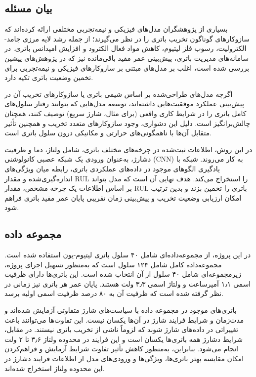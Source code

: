 \subsection{بیان مسئله}

بسیاری از پژوهشگران مدل‌های فیزیکی و نیمه‌تجربی مختلفی ارائه کرده‌اند که سازوکارهای گوناگون تخریب باتری را در نظر می‌گیرند؛ از جمله رشد لایه مرزی جامد-الکترولیت، رسوب فلز لیتیوم، کاهش مواد فعال الکترود و افزایش امپدانس باتری. در سامانه‌های مدیریت باتری، پیش‌بینی عمر مفید باقی‌مانده نیز که در پژوهش‌ها‌ی پیشین بررسی شده است، اغلب بر مدل‌های مبتنی بر سازوکارهای فیزیکی و نیمه‌تجربی برای تخمین وضعیت باتری تکیه دارد.

اگرچه مدل‌های طراحی‌شده بر اساس شیمی باتری یا سازوکارهای تخریب آن در پیش‌بینی عملکرد موفقیت‌هایی داشته‌اند، توسعه مدل‌هایی که بتوانند رفتار سلول‌های کامل باتری را در شرایط کاری واقعی (برای مثال، شارژ سریع) توصیف کنند، همچنان چالش‌برانگیز است. دلیل این دشواری، وجود سازوکارهای متعدد تخریب و همچنین تأثیر متقابل آن‌ها با ناهمگونی‌های حرارتی و مکانیکی درون سلول باتری است\cite{severson2019}.

در این روش، اطلاعات ثبت‌شده در چرخه‌های مختلف باتری، شامل ولتاژ، دما و ظرفیت دشارژ، به‌عنوان ورودی یک شبکه عصبی کانولوشنی (CNN) به کار می‌روند. شبکه با یادگیری الگوهای موجود در داده‌های عملکردی باتری، رابطه میان ویژگی‌های اندازه‌گیری‌شده و مقدار RUL را استخراج می‌کند. هدف نهایی آن است که مدل بتواند بر اساس اطلاعات یک چرخه مشخص، مقدار RUL باتری را تخمین بزند و بدین ترتیب امکان ارزیابی وضعیت تخریب و پیش‌بینی زمان تقریبی پایان عمر مفید باتری فراهم شود.

\subsection{مجموعه داده}

در این پروژه، از مجموعه‌داده‌ای شامل ۴۰ سلول باتری لیتیوم-یون استفاده شده است. مجموعه‌داده کامل شامل ۱۲۴ سلول است که به‌منظور تسهیل اجرای پروژه، زیرمجموعه‌ای شامل ۴۰ سلول از آن انتخاب شده است\cite{mathworks}. این باتری‌ها دارای ظرفیت اسمی ۱٫۱ آمپرساعت و ولتاژ اسمی ۳٫۳ ولت هستند. پایان عمر هر باتری نیز زمانی در نظر گرفته شده است که ظرفیت آن به ۸۰ درصد ظرفیت اسمی اولیه برسد.

باتری‌های موجود در مجموعه داده با سیاست‌های شارژ متفاوتی آزمایش شده‌اند و مدت‌زمان و شرایط فرایند شارژ در آن‌ها یکسان نیست. این تفاوت‌ها می‌توانند باعث تغییراتی در داده‌های شارژ شوند که لزوماً ناشی از تخریب باتری نیستند. در مقابل، شرایط دشارژ همه باتری‌ها یکسان است و این فرایند در محدوده ولتاژ ۳٫۶ تا ۲ ولت انجام می‌شود. بنابراین، به‌منظور کاهش تأثیر تفاوت شرایط آزمایش و فراهم‌کردن امکان مقایسه بهتر باتری‌ها، ویژگی‌ها و ورودی‌های مدل از اطلاعات فرایند دشارژ در این محدوده ولتاژ استخراج شده‌اند.

